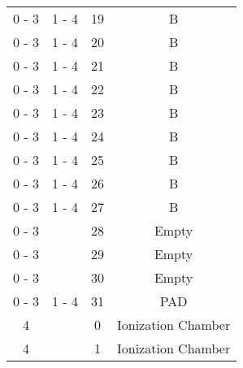 \begin{tabular}{cccc}
0 - 3  &  1 - 4   &  19     &  B                                                 \\
0 - 3  &  1 - 4   &  20     &  B                                                 \\
0 - 3  &  1 - 4   &  21     &  B                                                 \\
0 - 3  &  1 - 4   &  22     &  B                                                 \\
0 - 3  &  1 - 4   &  23     &  B                                                 \\
0 - 3  &  1 - 4   &  24     &  B                                                 \\
0 - 3  &  1 - 4   &  25     &  B                                                 \\
0 - 3  &  1 - 4   &  26     &  B                                                 \\
0 - 3  &  1 - 4   &  27     &  B                                                 \\
0 - 3  &          &  28     &  Empty                                             \\
0 - 3  &          &  29     &  Empty                                             \\
0 - 3  &          &  30     &  Empty                                             \\
0 - 3  &  1 - 4   &  31     &  PAD                                               \\
  4    &          &  0      &  Ionization Chamber                                \\
  4    &          &  1      &  Ionization Chamber                                \\
\hline
\end{tabular}